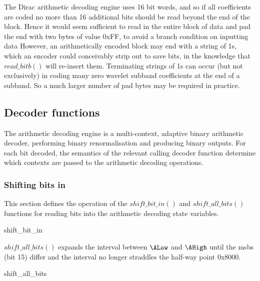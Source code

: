 \begin{informative}
The Dirac arithmetic decoding engine uses 16 bit words, and so if all coefficients are
coded no more than 16 additional bits should be read beyond the end of the block. Hence it 
would seem sufficient to read in the entire block of data and pad the end with two bytes of value 0xFF,
to avoid a branch condition on inputting data
However, an arithmetically encoded block may end with a string of 1s, which an encoder could
conceivably strip out to save bits, in the knowledge that $read\_bitb()$ will re-insert them. Terminating
strings of 1s can occur (but not exclusively) in coding many zero wavelet subband coefficients at the end
of a subband. So a much larger number of pad bytes may be required in practice.
\end{informative}

\subsection{Decoder functions}
\label{extractarith}
The arithmetic decoding engine is a multi-context, adaptive binary
arithmetic decoder, performing binary renormalisation and producing
binary outputs. For each bit decoded, the semantics of the relevant
calling decoder function determine which contexts are passed to the
arithmetic decoding operations.

\subsubsection{Shifting bits in}

\label{arithshiftin}

This section defines the operation of the $shift\_bit\_in()$ 
and $shift\_all\_bits()$ functions
for reading bits into the arithmetic decoding state variables.

\begin{pseudo}{shift\_bit\_in}{}
\end{pseudo}

$shift\_all\_bits()$ expands the interval between $\ALow$ and $\AHigh$
until the msbs (bit 15) differ and the interval no longer
straddles the half-way point 0x8000.

\begin{pseudo}{shift\_all\_bits}{}
\bsEND
{}
\bsEND
\end{pseudo}

